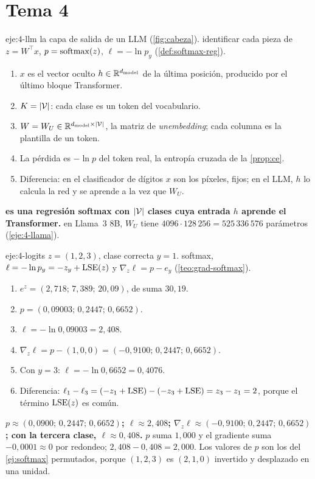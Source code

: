 \section{Tema 4}

\begin{solucion}{eje:4-llm}
\datos la capa de salida de un LLM (\cref{fig:cabeza}).
\planteamiento identificar cada pieza de $z=W^{\top}x$, $p=\operatorname{softmax}(z)$, $\ell=-\ln p_y$ (\cref{def:softmax-reg}).
\pasos
\begin{enumerate}[label=\arabic*.]
  \item $x$ es el vector oculto $h\in\mathbb{R}^{d_{\text{model}}}$ de la última posición, producido por el último bloque Transformer.
  \item $K=\lvert\mathcal{V}\rvert$: cada clase es un token del vocabulario.
  \item $W=W_U\in\mathbb{R}^{d_{\text{model}}\times\lvert\mathcal{V}\rvert}$, la matriz de \emph{unembedding}; cada columna es la plantilla de un token.
  \item La pérdida es $-\ln p$ del token real, la entropía cruzada de la \cref{prop:ce}.
  \item Diferencia: en el clasificador de dígitos $x$ son los píxeles, fijos; en el LLM, $h$ lo calcula la red y se aprende a la vez que $W_U$.
\end{enumerate}
\resultado \textbf{es una regresión softmax con $\lvert\mathcal{V}\rvert$ clases cuya entrada $h$ aprende el Transformer.}
\comprobacion en Llama~3 8B, $W_U$ tiene $4096\cdot 128\,256=525\,336\,576$ parámetros (\cref{eje:4-llama}).
\end{solucion}

\begin{solucion}{eje:4-logits}
\datos $z=(1,2,3)$, clase correcta $y=1$.
\planteamiento softmax, $\ell=-\ln p_y=-z_y+\operatorname{LSE}(z)$ y $\nabla_z\ell=p-e_y$ (\cref{teo:grad-softmax}).
\pasos
\begin{enumerate}[label=\arabic*.]
  \item $e^{z}=(2{,}718;\,7{,}389;\,20{,}09)$, de suma $30{,}19$.
  \item $p=(0{,}09003;\,0{,}2447;\,0{,}6652)$.
  \item $\ell=-\ln 0{,}09003=2{,}408$.
  \item $\nabla_z\ell=p-(1,0,0)=(-0{,}9100;\,0{,}2447;\,0{,}6652)$.
  \item Con $y=3$: $\ell=-\ln 0{,}6652=0{,}4076$.
  \item Diferencia: $\ell_1-\ell_3=(-z_1+\operatorname{LSE})-(-z_3+\operatorname{LSE})=z_3-z_1=2$, porque el término $\operatorname{LSE}(z)$ es común.
\end{enumerate}
\resultado \textbf{$p\approx(0{,}0900;\,0{,}2447;\,0{,}6652)$; $\ell\approx 2{,}408$; $\nabla_z\ell\approx(-0{,}9100;\,0{,}2447;\,0{,}6652)$; con la tercera clase, $\ell\approx 0{,}408$.}
\comprobacion $p$ suma $1{,}000$ y el gradiente suma $-0{,}0001\approx 0$ por redondeo; $2{,}408-0{,}408=2{,}000$. Los valores de $p$ son los del \cref{ej:softmax} permutados, porque $(1,2,3)$ es $(2,1,0)$ invertido y desplazado en una unidad.
\end{solucion}


